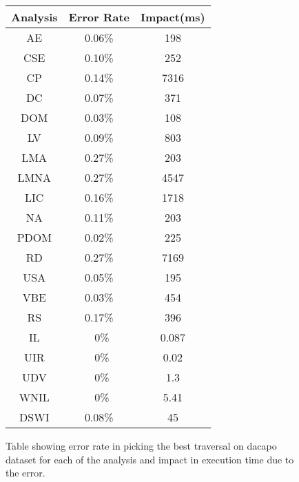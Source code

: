 
\begin{figure}[t]
\begin{footnotesize}
\begin{tabular}{ | c | c | c |}
\hline
\textbf{Analysis} & \textbf{Error Rate} & \textbf{Impact(ms)} \\ \hline
AE	& 0.06\%	& 198 \\ \hline
CSE	& 0.10\%	& 252 \\ \hline
CP	& 0.14\%	& 7316 \\ \hline
DC	& 0.07\%	& 371 \\ \hline
DOM	& 0.03\%	& 108 \\ \hline
LV	& 0.09\%	& 803 \\ \hline
LMA	& 0.27\%	& 203 \\ \hline
LMNA	& 0.27\%	& 4547 \\ \hline
LIC	& 0.16\%	& 1718 \\ \hline
NA	& 0.11\%	& 203 \\ \hline
PDOM	& 0.02\%	& 225 \\ \hline
RD	& 0.27\%	& 7169 \\ \hline
USA	& 0.05\%	& 195 \\ \hline
VBE	& 0.03\%	& 454 \\ \hline
RS	& 0.17\%	& 396 \\ \hline
IL	& ~0\%	& 0.087 \\ \hline
UIR	& ~0\%	& 0.02 \\ \hline
UDV	& ~0\%	& 1.3 \\ \hline
WNIL	& ~0\%	& 5.41 \\ \hline
DSWI	& 0.08\%	& 45 \\ \hline
\end{tabular}

\end{footnotesize}
\caption{Table showing error rate in picking the best traversal on dacapo dataset for each of the analysis and impact in execution time due to the error.}
\end{figure}
